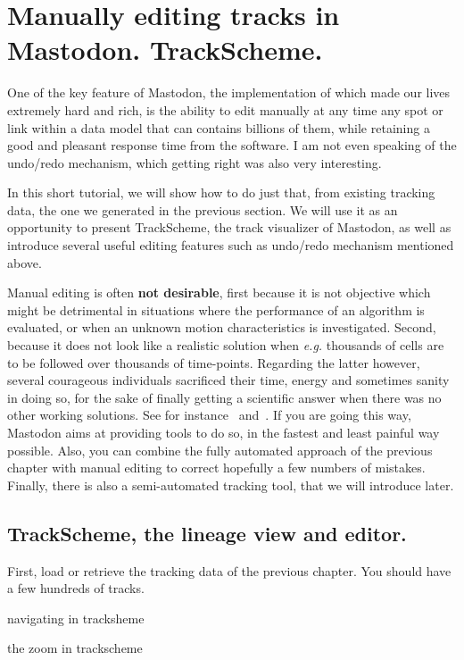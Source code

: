 \section{Manually editing tracks in Mastodon. TrackScheme.}

One of the key feature of Mastodon, the implementation of which made our lives extremely hard and rich, is the ability to edit manually at any time any spot or link within a data model that can contains billions of them, while retaining a good and pleasant response time from the software.
I am not even speaking of the undo/redo mechanism, which getting right was also very interesting. 

In this short tutorial, we will show how to do just that, from existing tracking data, the one we generated in the previous section. 
We will use it as an opportunity to present TrackScheme, the track visualizer of Mastodon, as well as introduce several useful editing features such as undo/redo mechanism mentioned above.

Manual editing is often \textbf{not desirable}, first because it is not objective which might be detrimental in situations where the performance of an algorithm is evaluated, or when an unknown motion characteristics is investigated. 
Second, because it does not look like a realistic solution when \textit{e.g.} thousands of cells are to be followed over thousands of time-points.
Regarding the latter however, several courageous individuals sacrificed their time, energy and sometimes sanity in doing so, for the sake of finally getting a scientific answer when there was no other working solutions. 
See for instance~\cite{MaMuT} and~\cite{McDole2018}.
If you are going this way, Mastodon aims at providing tools to do so, in the fastest and least painful way possible. 
Also, you can combine the fully automated approach of the previous chapter with manual editing to correct hopefully a few numbers of mistakes.
Finally, there is also a semi-automated tracking tool, that we will introduce later.


\subsection{TrackScheme, the lineage view and editor.}

First, load or retrieve the tracking data of the previous chapter. 
You should have a few hundreds of tracks. 

navigating in tracksheme

the zoom in trackscheme


